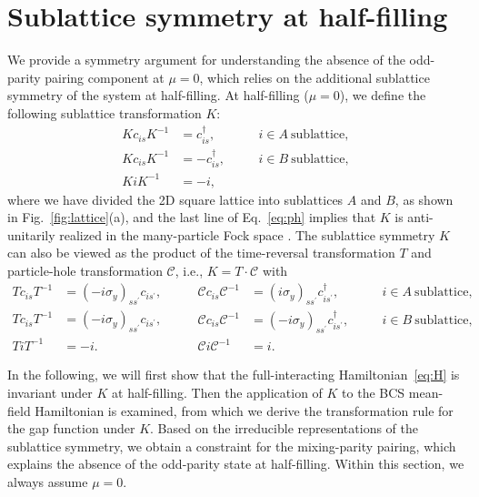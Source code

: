 \documentclass[11pt]{article}
\begin{document}
\section{Sublattice symmetry at half-filling}
We provide a symmetry argument for understanding the absence of the odd-parity pairing component at $\mu=0$,
which relies on the additional sublattice symmetry of the system at half-filling.
At half-filling ($\mu = 0$), we define the following sublattice transformation $K$:
\begin{equation}\label{eq:ph}
\begin{aligned}
    K c_{i s} K^{-1} &= c^\dagger_{i s}, \quad && i\in A\  \mathrm{sublattice},\\
    K c_{i s} K^{-1} &= -c^\dagger_{i s}, \quad && i\in B\  \mathrm{sublattice},\\
    K i K^{-1} &= -i,
\end{aligned}
\end{equation}
where we have divided the 2D square lattice into sublattices $A$ and $B$, as shown in Fig.~\ref{fig:lattice}(a),
and the last line of Eq.~\eqref{eq:ph} implies that $K$ is anti-unitarily realized in
the many-particle Fock space \cite{Ludwig2016}. The sublattice symmetry $K$ can also be
viewed as the product of the time-reversal transformation $T$ and particle-hole
transformation $\mathcal{C}$, i.e., $K = T\cdot \mathcal{C}$ with
\begin{equation}\label{eq:TC}
\begin{aligned}
    T c_{i s} T^{-1} &= (-i \sigma_y)_{s s^\prime}c_{i s^\prime}, \\
    T c_{i s} T^{-1} &= (-i \sigma_y)_{s s^\prime} c_{i s^\prime}, \\
    T i T^{-1} &= -i.
\end{aligned}
\qquad
\begin{aligned}
    \mathcal{C} c_{i s} \mathcal{C}^{-1} &= (i \sigma_y)_{s s^\prime}c^\dagger_{i s^\prime},
    \quad && i\in A\  \mathrm{sublattice},\\
    \mathcal{C} c_{i s} \mathcal{C}^{-1} &= (-i \sigma_y)_{s s^\prime} c^\dagger_{i s^\prime},
    \quad && i\in B\  \mathrm{sublattice},\\
    \mathcal{C} i \mathcal{C}^{-1} &= i.
\end{aligned}
\end{equation}

In the following, we will first show that the full-interacting Hamiltonian~\eqref{eq:H} is
invariant under $K$ at half-filling. Then the application of $K$ to the
BCS mean-field Hamiltonian is examined, from which we derive the transformation rule
for the gap function under $K$.
Based on the irreducible representations of the sublattice symmetry,
we obtain a constraint for the mixing-parity
pairing, which explains the absence of the odd-parity state at half-filling. Within this section,
we always assume $\mu=0$.
\end{document}
